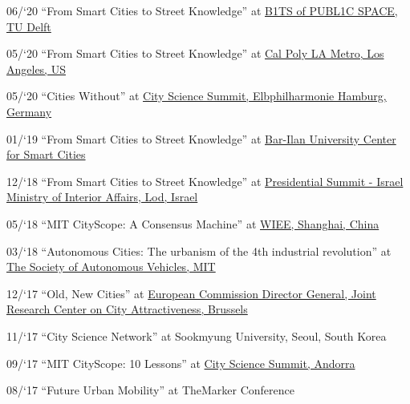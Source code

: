 \begin{tablist}
    \item[06/`20] \tab \enquote{From Smart Cities to Street Knowledge} at
    \href{http://www.polistudelft.nl/urbanism-week/b1ts-of-publ1c-space-3-0/}{B1TS of PUBL1C SPACE, TU Delft}

    \item[05/`20] \tab \enquote{From Smart Cities to Street Knowledge} at
    \href{https://www.youtube.com/watch?v=Rh5ks9x3720}{Cal Poly LA Metro, Los Angeles, US}

    \item[05/`20] \tab \enquote{Cities Without} at
    \href{https://www.youtube.com/watch?v=PZg6A_A65lQ}{City Science Summit, Elbphilharmonie Hamburg, Germany}

    \item[01/`19] \tab \enquote{From Smart Cities to Street Knowledge} at
    \href{https://law.biu.ac.il/sites/law/files/shared/mrym_khkmvt_lkhkmt_hrkhvb.pdf}{
        Bar-Ilan University Center for Smart Cities}

    \item[12/`18] \tab \enquote{From Smart Cities to Street Knowledge} at
    \href{https://www.youtube.com/watch?v=skIEkM9-1yg}{Presidential Summit - Israel Ministry of Interior Affairs, Lod, Israel}

    \item[05/`18] \tab \enquote{MIT CityScope: A Consensus Machine} at
    \href{https://wiee.tongji.edu.cn/CSS2018/}{WIEE, Shanghai, China}

    \item[03/`18] \tab \enquote{Autonomous Cities: The urbanism of the 4th industrial revolution} at \href{http://cameraculture.media.mit.edu/category/blog/}{The Society of Autonomous Vehicles, MIT}

    \item[12/`17] \tab \enquote{Old, New Cities} at \href{https://www.youtube.com/watch?v=AW-ljDEleLw}{European Commission Director General, Joint Research Center on City Attractiveness, Brussels}

    \item[11/`17] \tab \enquote{City Science Network} at {Sookmyung University, Seoul, South Korea}

    \item[09/`17] \tab \enquote{MIT CityScope: 10 Lessons} at \href{https://www.youtube.com/watch?v=bRNbap13I5w}{City Science Summit, Andorra}


    \item[08/`17] \tab \enquote{Future Urban Mobility} at {TheMarker Conference}


\end{tablist}

